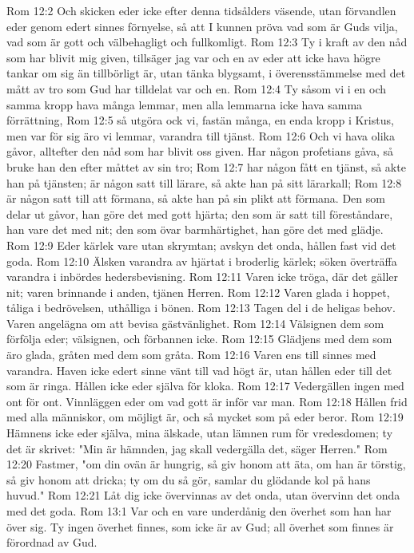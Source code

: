 Rom 12:2  Och skicken eder icke efter denna tidsålders väsende, utan förvandlen eder genom edert sinnes förnyelse, så att I kunnen pröva vad som är Guds vilja, vad som är gott och välbehagligt och fullkomligt.
Rom 12:3  Ty i kraft av den nåd som har blivit mig given, tillsäger jag var och en av eder att icke hava högre tankar om sig än tillbörligt är, utan tänka blygsamt, i överensstämmelse med det mått av tro som Gud har tilldelat var och en.
Rom 12:4  Ty såsom vi i en och samma kropp hava många lemmar, men alla lemmarna icke hava samma förrättning,
Rom 12:5  så utgöra ock vi, fastän många, en enda kropp i Kristus, men var för sig äro vi lemmar, varandra till tjänst.
Rom 12:6  Och vi hava olika gåvor, alltefter den nåd som har blivit oss given. Har någon profetians gåva, så bruke han den efter måttet av sin tro;
Rom 12:7  har någon fått en tjänst, så akte han på tjänsten; är någon satt till lärare, så akte han på sitt lärarkall;
Rom 12:8  är någon satt till att förmana, så akte han på sin plikt att förmana. Den som delar ut gåvor, han göre det med gott hjärta; den som är satt till föreståndare, han vare det med nit; den som övar barmhärtighet, han göre det med glädje.
Rom 12:9  Eder kärlek vare utan skrymtan; avskyn det onda, hållen fast vid det goda.
Rom 12:10  Älsken varandra av hjärtat i broderlig kärlek; söken överträffa varandra i inbördes hedersbevisning.
Rom 12:11  Varen icke tröga, där det gäller nit; varen brinnande i anden, tjänen Herren.
Rom 12:12  Varen glada i hoppet, tåliga i bedrövelsen, uthålliga i bönen.
Rom 12:13  Tagen del i de heligas behov. Varen angelägna om att bevisa gästvänlighet.
Rom 12:14  Välsignen dem som förfölja eder; välsignen, och förbannen icke.
Rom 12:15  Glädjens med dem som äro glada, gråten med dem som gråta.
Rom 12:16  Varen ens till sinnes med varandra. Haven icke edert sinne vänt till vad högt är, utan hållen eder till det som är ringa. Hållen icke eder själva för kloka.
Rom 12:17  Vedergällen ingen med ont för ont. Vinnläggen eder om vad gott är inför var man.
Rom 12:18  Hållen frid med alla människor, om möjligt är, och så mycket som på eder beror.
Rom 12:19  Hämnens icke eder själva, mina älskade, utan lämnen rum för vredesdomen; ty det är skrivet: "Min är hämnden, jag skall vedergälla det, säger Herren."
Rom 12:20  Fastmer, "om din ovän är hungrig, så giv honom att äta, om han är törstig, så giv honom att dricka; ty om du så gör, samlar du glödande kol på hans huvud."
Rom 12:21  Låt dig icke övervinnas av det onda, utan övervinn det onda med det goda.
Rom 13:1  Var och en vare underdånig den överhet som han har över sig. Ty ingen överhet finnes, som icke är av Gud; all överhet som finnes är förordnad av Gud.
